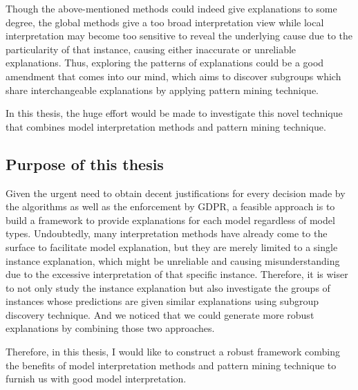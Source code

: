 Though the above-mentioned methods could indeed give explanations to some degree, the global methods give a too broad interpretation view while local interpretation may become too sensitive to reveal the underlying cause due to the particularity of that instance, causing either inaccurate or unreliable explanations. Thus, exploring the patterns of explanations could be a good amendment that comes into our mind, which aims to discover subgroups which share interchangeable explanations by applying pattern mining technique. 

In this thesis, the huge effort would be made to investigate this novel technique that combines model interpretation methods and pattern mining technique. 

\subsection{Purpose of this thesis}

Given the urgent need to obtain decent justifications for every decision made by the algorithms as well as the enforcement by GDPR, a feasible approach is to build a framework to provide explanations for each model regardless of model types. Undoubtedly, many interpretation methods have already come to the surface to facilitate model explanation, but they are merely limited to a single instance explanation, which might be unreliable and causing misunderstanding due to the excessive interpretation of that specific instance. Therefore, it is wiser to not only study the instance explanation but also investigate the groups of instances whose predictions are given similar explanations using subgroup discovery technique. And we noticed that we could generate more robust explanations by combining those two approaches. 

Therefore, in this thesis, I would like to construct a robust framework combing the benefits of model interpretation methods and pattern mining technique to furnish us with good model interpretation. 


%
%	
%	
%	
%	
%	


